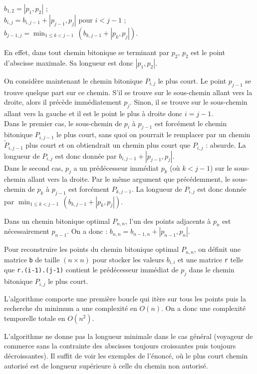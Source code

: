 \hspace*{.5cm}$b_{1,2} = |p_1,p_2|$ \quad ;\\
\hspace*{.5cm}$b_{i,j} = b_{i,j-1}+|p_{j-1},p_j|$ pour $i < j-1$ \quad ;\\
\hspace*{.5cm}$b_{j-1,j} = \displaystyle\min_{1 \leq k < j-1}\,(b_{k,j-1}+|p_k,p_j|)$.

En effet, dans tout chemin bitonique se terminant par $p_2$, $p_2$ est le point d'abscisse maximale. Sa longueur est donc $|p_1,p_2|$.
\medskip

On considère maintenant le chemin bitonique $P_{i,j}$ le plus court. Le point $p_{j-1}$ se trouve quelque part sur ce chemin. S'il se trouve sur le sous-chemin allant vers la droite, alors il précède immédiatement $p_j$. Sinon, il se trouve sur le sous-chemin allant vers la gauche et il est le point le plus à droite donc $i=j-1$.\\
Dans le premier cas, le sous-chemin de $p_i$ à $p_{j-1}$ est forcément le chemin bitonique $P_{i,j-1}$ le plus court, sans quoi on pourrait le remplacer par un chemin $\tilde{P}_{i,j-1}$ plus court et on obtiendrait un chemin plus court que $P_{i,j}$ : absurde. La longueur de $P_{i,j}$ est donc donnée par $b_{i,j-1}+|p_{j-1},p_j|$.\\
Dans le second cas, $p_j$ a un prédécesseur immédiat $p_k$ (où $k<j-1$) sur le sous-chemin allant vers la droite. Par le même argument que précédemment, le sous-chemin de $p_k$ à $p_{j-1}$ est forcément $P_{k,j-1}$. La longueur de $P_{i,j}$ est donc donnée par $\displaystyle\min_{1 \leq k < j-1}\,(b_{k,j-1}+|p_k,p_j|)$.
\medskip

Dans un chemin bitonique optimal $P_{n,n}$, l'un des points adjacents à $p_n$ est nécessairement $p_{n-1}$. On a donc : $b_{n,n}=b_{n-1,n}+|p_{n-1},p_n|$.
\medskip

Pour reconstruire les points du chemin bitonique optimal $P_{n,n}$, on définit une matrice \texttt{b} de taille $(n \times n)$ pour stocker les valeurs $b_{i,i}$ et une matrice \texttt{r} telle que \texttt{r.(i-1).(j-1)} contient le prédécesseur immédiat de $p_j$ dans le chemin bitonique $P_{i,j}$ le plus court.
\medskip

L'algorithme comporte une première boucle qui itère sur tous les points puis la recherche du minimum a une complexité en $O(n)$. On a donc une complexité temporelle totale en $O(n^2)$.

\Q
L'algorithme ne donne pas la longueur minimale dans le cas général (voyageur de commerce sans la contrainte des abscisses toujours croissantes puis toujours décroissantes). Il suffit de voir les exemples de l'énoncé, où le plus court chemin autorisé est de longueur supérieure à celle du chemin non autorisé.
\bigskip

\Fin
